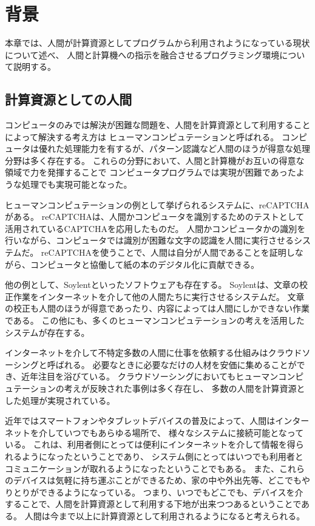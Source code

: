 \chapter{背景}\label{chap:background}

本章では、人間が計算資源としてプログラムから利用されようになっている現状について述べ、
人間と計算機への指示を融合させるプログラミング環境について説明する。

\newpage

\section{計算資源としての人間}\label{sec:human-as-computational-resources}

コンピュータのみでは解決が困難な問題を、人間を計算資源として利用することによって解決する考え方は
ヒューマンコンピュテーション\cite{humancomputation}と呼ばれる。
コンピュータは優れた処理能力を有するが、パターン認識など人間のほうが得意な処理分野は多く存在する。
これらの分野において、人間と計算機がお互いの得意な領域で力を発揮することで
コンピュータプログラムでは実現が困難であったような処理でも実現可能となった。

ヒューマンコンピュテーションの例として挙げられるシステムに、reCAPTCHA\cite{recaptcha}がある。
reCAPTCHAは、人間かコンピュータを識別するためのテストとして活用されているCAPTCHA\cite{captcha}を応用したものだ。
人間かコンピュータかの識別を行いながら、コンピュータでは識別が困難な文字の認識を人間に実行させるシステムだ。
reCAPTCHAを使うことで、人間は自分が人間であることを証明しながら、コンピュータと協働して紙の本のデジタル化に貢献できる。

他の例として、Soylent\cite{soylent}といったソフトウェアも存在する。
Soylentは、文章の校正作業をインターネットを介して他の人間たちに実行させるシステムだ。
文章の校正も人間のほうが得意であったり、内容によっては人間にしかできない作業である。
この他にも、多くのヒューマンコンピュテーションの考えを活用したシステムが存在する。

インターネットを介して不特定多数の人間に仕事を依頼する仕組みはクラウドソーシング\cite{riseofcrowdsourcing}と呼ばれる。
必要なときに必要なだけの人材を安価に集めることができ、近年注目を浴びている。
クラウドソーシングにおいてもヒューマンコンピュテーションの考えが反映された事例は多く存在し、
多数の人間を計算資源とした処理が実現されている。

近年ではスマートフォンやタブレットデバイスの普及によって、人間はインターネットを介していつでもあらゆる場所で、
様々なシステムに接続可能となっている。
これは、利用者側にとっては便利にインターネットを介して情報を得られるようになったということであり、
システム側にとってはいつでも利用者とコミュニケーションが取れるようになったということでもある。
また、これらのデバイスは気軽に持ち運ぶことができるため、家の中や外出先等、どこでもやりとりができるようになっている。
つまり、いつでもどこでも、デバイスを介することで、人間を計算資源として利用する下地が出来つつあるということである。
人間は今まで以上に計算資源として利用されるようになると考えられる。

